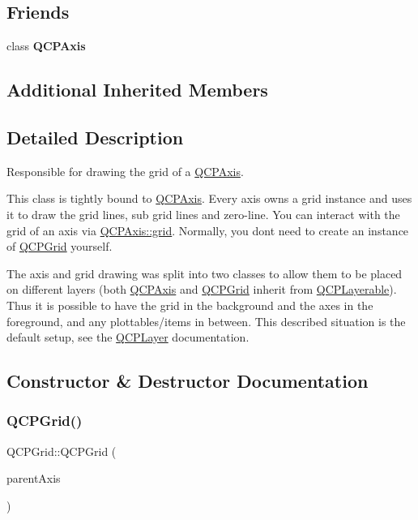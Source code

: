 \subsection*{Friends}
\begin{DoxyCompactItemize}
\item 
\mbox{\label{classQCPGrid_af123edeca169ec7a31958a1d714e1a8a}} 
class {\bfseries Q\+C\+P\+Axis}
\end{DoxyCompactItemize}
\subsection*{Additional Inherited Members}


\subsection{Detailed Description}
Responsible for drawing the grid of a \hyperlink{classQCPAxis}{Q\+C\+P\+Axis}. 

This class is tightly bound to \hyperlink{classQCPAxis}{Q\+C\+P\+Axis}. Every axis owns a grid instance and uses it to draw the grid lines, sub grid lines and zero-\/line. You can interact with the grid of an axis via \hyperlink{classQCPAxis_a63f1dd2df663680d2a8d06c19592dd63}{Q\+C\+P\+Axis\+::grid}. Normally, you don\textquotesingle{}t need to create an instance of \hyperlink{classQCPGrid}{Q\+C\+P\+Grid} yourself.

The axis and grid drawing was split into two classes to allow them to be placed on different layers (both \hyperlink{classQCPAxis}{Q\+C\+P\+Axis} and \hyperlink{classQCPGrid}{Q\+C\+P\+Grid} inherit from \hyperlink{classQCPLayerable}{Q\+C\+P\+Layerable}). Thus it is possible to have the grid in the background and the axes in the foreground, and any plottables/items in between. This described situation is the default setup, see the \hyperlink{classQCPLayer}{Q\+C\+P\+Layer} documentation. 

\subsection{Constructor \& Destructor Documentation}
\mbox{\label{classQCPGrid_acd1cdd2909625388a13048b698494a17}} 
\subsubsection{\texorpdfstring{Q\+C\+P\+Grid()}{QCPGrid()}}
{\footnotesize\ttfamily Q\+C\+P\+Grid\+::\+Q\+C\+P\+Grid (\begin{DoxyParamCaption}\item[{\hyperlink{classQCPAxis}{Q\+C\+P\+Axis} $\ast$}]{parent\+Axis }\end{DoxyParamCaption})\hspace{0.3cm}{\ttfamily [explicit]}}


